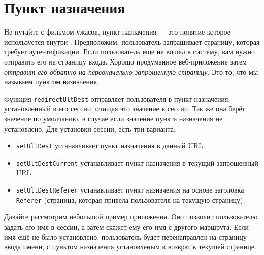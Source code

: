 \section{Пункт назначения}

Не путайте с фильмом ужасов, пункт назначения --- это понятие которое используется внутри . Предположим, пользователь запрашивает страницу, которая требует аутентификации. Если пользователь еще не вошел в систему, вам нужно отправить его на страницу входа. Хорошо продуманное веб-приложение затем \emph{отправит его обратно на первоначально запрошенную страницу}. Это то, что мы называем пунктом назначения. 

Функция \lstinline'redirectUltDest' отправляет пользователя в пункт назначения, установленный в его сессии, очищая это значение в сессии. Так же она берёт значение по умолчанию, в случае если значение пункта назначения не установлено. Для установки сессии, есть три варианта:

\begin{itemize}
  \item \lstinline'setUltDest' устанавливает пункт назначения в данный URL
  \item \lstinline'setUltDestCurrent' устанавливает пункт назначения в текущий запрошенный URL.
  \item \lstinline'setUltDestReferer' устанавливает пункт назначения на основе заголовка \lstinline'Referer' (страница, которая привела пользователя на текущую страницу). 
\end{itemize}

Давайте рассмотрим небольшой пример приложения. Оно позволит пользователю задать его имя в сессии, а затем скажет ему его имя с другого маршрута. Если имя ещё не было установлено, пользователь будет перенаправлен на страницу ввода имени, с пунктом назначения установленым в возврат к текущей странице.

